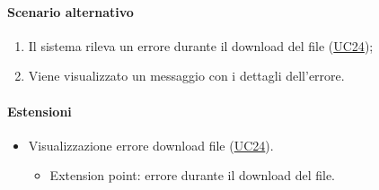 \paragraph*{Scenario alternativo}
\begin{enumerate}
  \item Il sistema rileva un errore durante il download del file (\hyperref[UC24]{UC24});
  \item Viene visualizzato un messaggio con i dettagli dell'errore.
\end{enumerate}

\paragraph*{Estensioni}
\begin{itemize}
  \item Visualizzazione errore download file (\hyperref[UC24]{UC24}).
  \begin{itemize}
    \item Extension point: errore durante il download del file.
  \end{itemize}
\end{itemize}